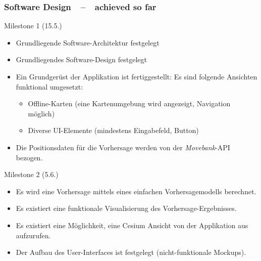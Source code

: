 \documentclass[xcolor=dvipsnames]{beamer}
\begin{document}
\begin{frame}
	\frametitle{\textbf{Software Design}~~--~~achieved so far}
	\large{Milestone 1 (15.5.)}
	\normalsize
	\begin{itemize} 
		\item \color{Green}Grundliegende Software-Architektur festgelegt
		\item \color{Green}Grundliegendes Software-Design festgelegt
		\item \color{Green}Ein Grundgerüst der Applikation ist fertiggestellt: Es sind folgende Ansichten funktional umgesetzt:
		\begin{itemize} 
			\item \color{Green}Offline-Karten (eine Kartenumgebung wird angezeigt, Navigation möglich)
			\item \color{Green}Diverse UI-Elemente (mindestens Eingabefeld, Button)
		\end{itemize} 
		\item \color{LightGray}Die Positionsdaten für die Vorhersage werden von der \textit{Movebank}-API bezogen.
	\end{itemize}     
	\large{Milestone 2 (5.6.)}
	\normalsize
	\begin{itemize} 
		\item \color{LightGray}Es wird eine Vorhersage mittels eines einfachen Vorhersagemodells berechnet.
		\item \color{LightGray}Es existiert eine funktionale Visualisierung des Vorhersage-Ergebnisses.
		\item \color{LightGray}Es existiert eine Möglichkeit, eine Cesium Ansicht von der Applikation aus aufzurufen.
		\item \color{Green}Der Aufbau des User-Interfaces ist festgelegt (nicht-funktionale Mockups).
	\end{itemize}
\end{frame}
\end{document}
